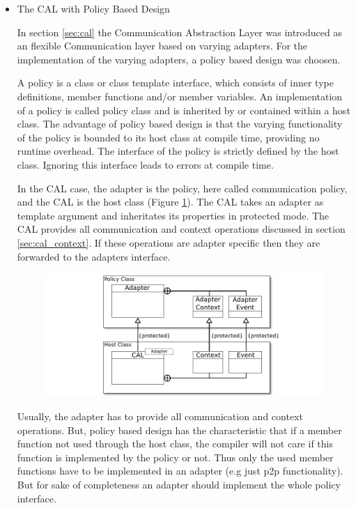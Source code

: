 \begin{itemize}
\item The CAL with Policy Based Design

  In section \ref{sec:cal} the Communication Abstraction Layer was
  introduced as an flexible Communication layer based on varying
  adapters. For the implementation of the varying adapters, a policy
  based design was choosen.

  A policy is a class or class template interface, which consists of
  inner type definitions, member functions and/or member variables. An
  implementation of a policy is called policy class and is inherited
  by or contained within a host class.  The advantage of policy based
  design is that the varying functionality of the policy is bounded to
  its host class at compile time, providing no runtime overhead. 
  The interface of the policy is strictly defined by the host
  class. Ignoring this interface leads to errors at compile time.

  In the CAL case, the adapter is the policy, here called
  communication policy, and the CAL is the host class (Figure
  \ref{fig:cal_uml}). The CAL takes an adapter as template argument
  and inheritates its properties in protected mode. The CAL provides
  all communication and context operations discussed in section
  \ref{sec:cal_context}. If these operations are adapter specific then
  they are forwarded to the adapters interface.


  \begin{figure}[H]
    \centering \includegraphics[width=\textwidth]{graphics/40_cal_uml}
    \caption{  }
    \label{fig:cal_uml}
  \end{figure}

  Usually, the adapter has to provide all communication and context
  operations. But, policy based design has the characteristic
  that if a member function not used through the host class, the
  compiler will not care if this function is implemented by the policy
  or not. Thus only the used member functions have to be implemented
  in an adapter (e.g just p2p functionality). But for sake of
  completeness an adapter should implement the whole policy interface.


\end{itemize}
